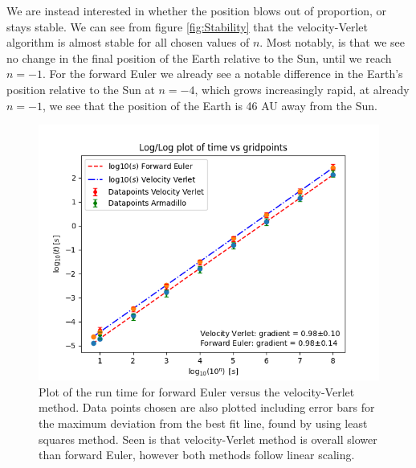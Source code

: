 \documentclass[%
reprint,
nofootinbib,
amsmath,amssymb,
aps,
]{revtex4-1}
\begin{document}
We are instead interested in whether the position blows out of proportion, or stays stable.
We can see from figure \ref{fig:Stability} that the velocity-Verlet algorithm is almost stable for all chosen values of $n$. Most notably, is that we see no change in the final position of the Earth relative to the Sun, until we reach $n = -1$. For the forward Euler we already see a notable difference in the Earth's position relative to the Sun at $n=-4$, which grows increasingly rapid, at already $n=-1$, we see that the position of the Earth is 46 AU away from the Sun. 
\begin{figure}[]
	\centering
	\includegraphics[width=0.9\linewidth]{../code/classes/figure/TC.png}
	\caption{Plot of the run time for forward Euler versus the velocity-Verlet method. Data points chosen are also plotted including error bars for the maximum deviation from the best fit line, found by using least squares method. Seen is that velocity-Verlet method is overall slower than forward Euler, however both methods follow linear scaling.}
	\label{fig:TC}
\end{figure}
\end{document}
